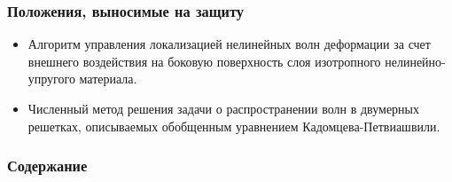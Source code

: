 \begin{frame}
    \setcounter{framenumber}{1}
    \maketitle
\end{frame}

\begin{frame}
    \frametitle{Положения, выносимые на защиту}
    \begin{itemize}
        \item Алгоритм управления локализацией нелинейных волн
        деформации за счет внешнего воздействия на боковую поверхность слоя
        изотропного нелинейно-упругого материала.
        \item Численный метод решения задачи о распространении волн в двумерных решетках, описываемых обобщенным уравнением Кадомцева-Петвиашвили.
    \end{itemize}
\end{frame}

\begin{frame}
    \frametitle{Содержание}
    \tableofcontents
\end{frame}
